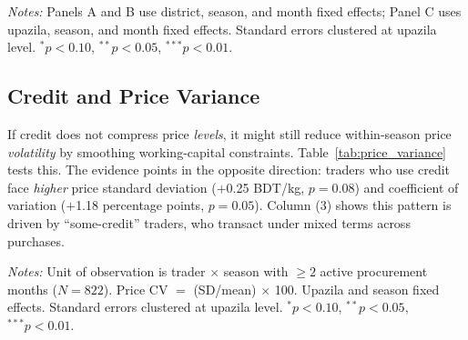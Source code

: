 \documentclass[authoryear,preprint,review,12pt]{elsarticle}
\begin{document}
\begin{table}[htbp]
  \centering
  \caption{Heterogeneous Price Effects of Supplier Credit}
  \label{tab:heterogeneity}
  \begin{singlespace}
  \begin{threeparttable}
    
    \begin{tablenotes}\footnotesize
      \item \textit{Notes:} Panels A and B use district, season, and month
      fixed effects; Panel C uses upazila, season, and month fixed effects.
      Standard errors clustered at upazila level.
      $^{*}p<0.10$, $^{**}p<0.05$, $^{***}p<0.01$.
    \end{tablenotes}
  \end{threeparttable}
  \end{singlespace}
\end{table}

\subsection{Credit and Price Variance}

If credit does not compress price \emph{levels}, it might still reduce
within-season price \emph{volatility} by smoothing working-capital
constraints. Table~\ref{tab:price_variance} tests this. The evidence points
in the opposite direction: traders who use credit face \emph{higher} price
standard deviation ($+$0.25 BDT/kg, $p = 0.08$) and coefficient of
variation ($+$1.18 percentage points, $p = 0.05$). Column (3) shows this
pattern is driven by ``some-credit'' traders, who transact under mixed terms
across purchases.

\begin{table}[htbp]
  \centering
  \caption{Supplier Credit and Within-Season Price Variance}
  \label{tab:price_variance}
  \begin{singlespace}
  \begin{threeparttable}
    
    \begin{tablenotes}\footnotesize
      \item \textit{Notes:} Unit of observation is trader $\times$ season
      with $\geq 2$ active procurement months ($N = 822$).
      Price CV $=$ (SD/mean) $\times$ 100. Upazila and season fixed effects.
      Standard errors clustered at upazila level.
      $^{*}p<0.10$, $^{**}p<0.05$, $^{***}p<0.01$.
    \end{tablenotes}
  \end{threeparttable}
  \end{singlespace}
\end{table}
\end{document}
